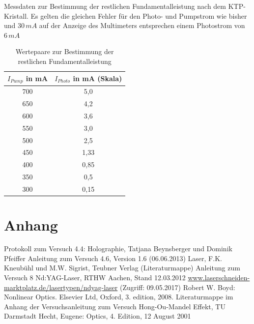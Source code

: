 \documentclass[twoside,colorback,accentcolor=tud4c,11pt]{tudreport}
\begin{document}
Messdaten zur Bestimmung der restlichen Fundamentalleistung nach dem KTP-Kristall. Es gelten die gleichen Fehler für den Photo- und Pumpstrom wie bisher und $30\,\si{mA}$ auf der Anzeige des Multimeters entsprechen einem Photostrom von $6\,\si{mA}$
\begin{table}[H]
\renewcommand*{\arraystretch}{1.2}
\centering
\begin{tabular}{|c|c|}
\hline 
$I_{Pump}$ in mA & $I_{Photo}$ in mA (Skala)\\
\hline 
700 & 5,0  \\ 
\hline 
650 & 4,2  \\ 
\hline 
600 & 3,6  \\ 
\hline 
550 & 3,0  \\ 
\hline 
500 & 2,5  \\ 
\hline
450 & 1,33 \\ 
\hline
400 & 0,85 \\ 
\hline
350 & 0,5 \\ 
\hline
300 & 0,15 \\ 
\hline
\end{tabular} 
\caption{Wertepaare zur Bestimmung der restlichen Fundamentalleistung}\label{restfund}
\end{table}
\chapter{Anhang}





		

\renewcommand{\bibname}{Literatur}
\begin{thebibliography}{0}
 Protokoll zum Versuch 4.4: Holographie, Tatjana Beynsberger und Dominik Pfeiffer 
 Anleitung zum Versuch 4.6, Version 1.6 (06.06.2013)
 Laser, F.K. Kneubühl und M.W. Sigrist, Teubner Verlag (Literaturmappe)
 Anleitung zum Versuch 8 Nd:YAG-Laser, RTHW Aachen, Stand 12.03.2012
 \url{www.laserschneiden-marktplatz.de/lasertypen/ndyag-laser} (Zugriff: 09.05.2017)
 Robert W. Boyd: Nonlinear Optics. Elsevier Ltd, Oxford, 3. edition, 2008.
 Literaturmappe im Anhang der Versuchsanleitung zum Versuch Hong-Ou-Mandel Effekt, TU Darmstadt
 Hecht, Eugene: Optics, 4. Edition, 12 August 2001
\end{thebibliography} 	
\end{document}
